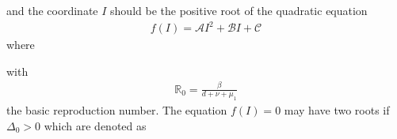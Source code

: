 \documentclass[letterpaper,10pt,english]{jupyterBook}
\begin{document}
\sphinxAtStartPar
and the coordinate \(I\) should be the positive root of the quadratic equation
\begin{equation*}
\begin{split}
f(I)=\mathscr{A} I^{2}+\mathscr{B} I+\mathscr{C}
\end{split}
\end{equation*}
\sphinxAtStartPar
where

\begin{sphinxVerbatim}[commandchars=\\\{\}]
\end{sphinxVerbatim}

\sphinxAtStartPar
with
\begin{equation*}
\begin{split}
\mathbb{R}_{0}=\frac{\beta}{d+\nu+\mu_{1}}
\end{split}
\end{equation*}
\sphinxAtStartPar
the basic reproduction number.  The equation \(f(I)=0\) may have two roots if
\(\Delta_{0}>0\) which are denoted as
\end{document}
